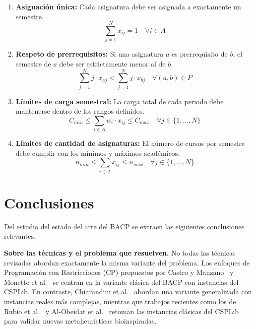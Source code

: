 \documentclass[letter, 10pt]{article}
\begin{document}
\begin{enumerate}
    \item \textbf{Asignaci\'{o}n \'unica:} Cada asignatura debe ser asignada a exactamente un semestre.
    $$\sum_{j=1}^{N} x_{ij} = 1 \quad \forall i \in A$$
    
    \item \textbf{Respeto de prerrequisitos:} Si una asignatura $a$ es prerrequisito de $b$, el semestre de $a$ debe ser estrictamente menor al de $b$.
    $$\sum_{j=1}^{N} j \cdot x_{aj} < \sum_{j=1}^{N} j \cdot x_{bj} \quad \forall (a, b) \in P$$
    
    \item \textbf{L\'{i}mites de carga semestral:} La carga total de cada periodo debe mantenerse dentro de los rangos definidos.
    $$C_{min} \leq \sum_{i \in A} w_i \cdot x_{ij} \leq C_{max} \quad \forall j \in \{1, \dots, N\}$$
    
    \item \textbf{L\'{i}mites de cantidad de asignaturas:} El n\'umero de cursos por semestre debe cumplir con los m\'{i}nimos y m\'{a}ximos acad\'{e}micos.
    $$n_{min} \leq \sum_{i \in A} x_{ij} \leq n_{max} \quad \forall j \in \{1, \dots, N\}$$
\end{enumerate}

\section{Conclusiones}

Del estudio del estado del arte del BACP se extraen las siguientes 
conclusiones relevantes.

\textbf{Sobre las t\'ecnicas y el problema que resuelven.} No todas 
las t\'ecnicas revisadas abordan exactamente la misma variante del 
problema. Los enfoques de Programaci\'on con Restricciones (CP) 
propuestos por Castro y Manzano~\cite{Castro2001} y Monette et 
al.~\cite{Monette2007} se centran en la variante cl\'asica del BACP 
con instancias del CSPLib. En contraste, Chiarandini et 
al.~\cite{Chiarandini2012} abordan una variante generalizada con 
instancias reales m\'as complejas, mientras que trabajos recientes 
como los de Rubio et al.~\cite{rubio2013} y Al-Obeidat et 
al.~\cite{Firefly2023} retoman las instancias cl\'asicas del CSPLib 
para validar nuevas metaheur\'isticas bioinspiradas.
\end{document}
